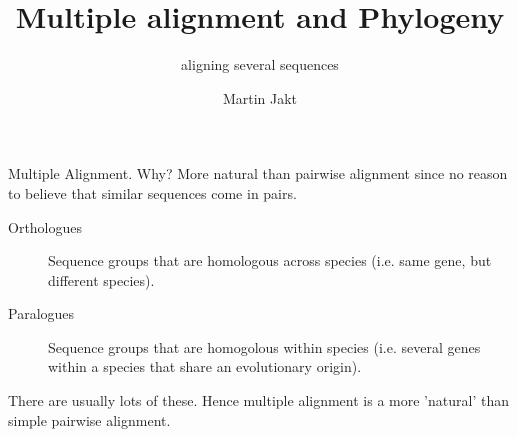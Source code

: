 \documentclass[pdf]{beamer}
\title{Multiple alignment and Phylogeny}
\subtitle{aligning several sequences}
\author{Martin Jakt}
\begin{document}
\begin{frame}
  \titlepage
\end{frame}

\begin{frame}{Multiple Alignment. Why?}
  More natural than pairwise alignment since no reason to
  believe that similar sequences come in pairs.
  \pause
  \begin{description}
  \item[Orthologues] Sequence groups that are homologous across species
    (i.e. same gene, but different species).
  \item[Paralogues] Sequence groups that are homogolous within species
    (i.e. several genes within a species that share an evolutionary origin).
  \end{description}
  \pause

  There are usually lots of these. Hence multiple alignment is a more 'natural'
  than simple pairwise alignment.  
\end{frame}
\end{document}
